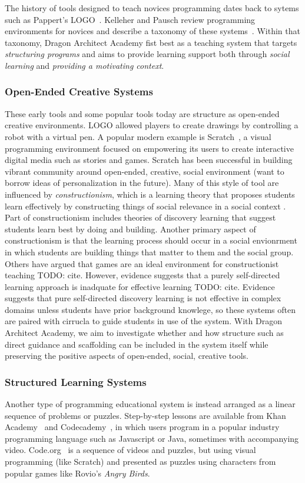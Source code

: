 \documentclass{sig-alternate}
\newcommand{\TODO}[1]{{\color{red} TODO: #1}}
\newcommand{\gametitle}{{\color{RoyalPurple} Dragon Architect Academy}}
\begin{document}
The history of tools designed to teach novices programming dates back to sytems such as Pappert's LOGO~\cite{papert80mindstorms}.
Kelleher and Pausch review programming environments for novices and describe a taxonomy of these systems~\cite{kelleher2005lowering}.
Within that taxonomy, \gametitle{} fist best as a teaching system that targets \emph{structuring programs} and aims to provide learning support both through \emph{social learning} and \emph{providing a motivating context}.

\subsubsection{Open-Ended Creative Systems}
These early tools and some popular tools today are structure as open-ended creative environments.
LOGO allowed players to create drawings by controlling a robot with a virtual pen.
A popular modern example is Scratch~\cite{maloney2010scratch}, a visual programming environment focused on empowering its users to create interactive digital media such as stories and games.
Scratch has been successful in building vibrant community around open-ended, creative, social environment (want to borrow ideas of personalization in the future).
Many of this style of tool are influenced by \emph{constructionism}, which is a learning theory that proposes students learn effectively by constructing things of social relevance in a social context \cite{kafai06constructionism}.
Part of constructionism includes theories of discovery learning that suggest students learn best by doing and building.
Another primary aspect of constructionism is that the learning process should occur in a social envionrment in which students are building things that matter to them and the social group.
Others have argued that games are an ideal environment for constructionist teaching \TODO{cite}.
However, evidence suggests that a purely self-directed learning approach is inadquate for effective learning \TODO{cite}.
Evidence suggests that pure self-directed discovery learning is not effective in complex domains unless students have prior background knowlege, so these systems often are paired with cirrucla to guide students in use of the system.
With \gametitle{}, we aim to investigate whether and how structure such as direct guidance and scaffolding can be included in the system itself while preserving the positive aspects of open-ended, social, creative tools.

\subsubsection{Structured Learning Systems}
Another type of programming educational system is instead arranged as a linear sequence of problems or puzzles.
Step-by-step lessons are available from Khan Academy~\cite{khanacademy} and Codecademy~\cite{codecademy}, in which users program in a popular industry programming language such as Javascript or Java, sometimes with accompanying video.
Code.org~\cite{codedotorg} is a sequence of videos and puzzles, but using visual programming (like Scratch) and presented as puzzles using characters from popular games like Rovio's \emph{Angry Birds}.
\end{document}
